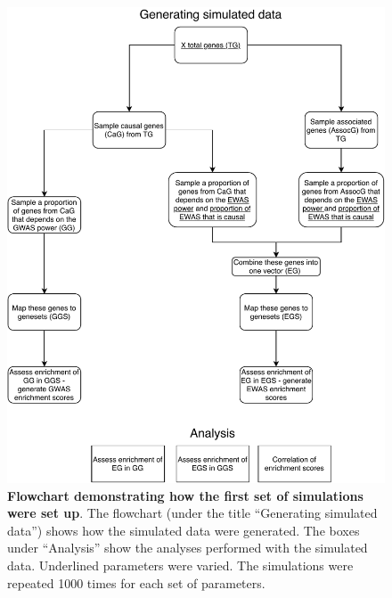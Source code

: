 \documentclass[11pt,oneside]{bristolthesis}
\begin{document}
\begin{figure}

{\centering \includegraphics[width=1\linewidth]{figure/06-ewas_gwas_comparison/simulations-gene-up-flowchart} 

}

\caption[Flowchart demonstrating how the first set of simulations were set up]{\textbf{Flowchart demonstrating how the first set of simulations were set up}. The flowchart (under the title ``Generating simulated data'') shows how the simulated data were generated. The boxes under ``Analysis'' show the analyses performed with the simulated data. Underlined parameters were varied. The simulations were repeated 1000 times for each set of parameters.}\label{fig:method-simulations-schematic}
\end{figure}
\end{document}

